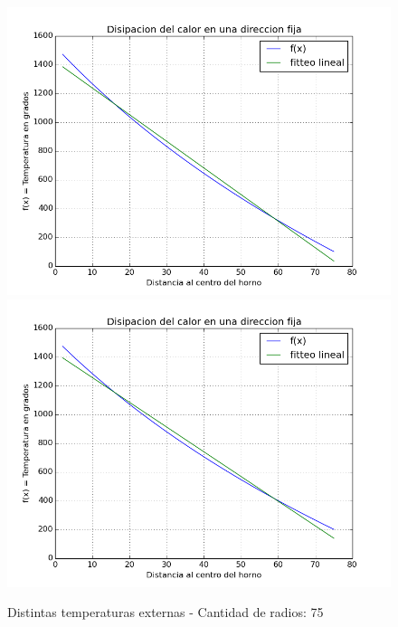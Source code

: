 \begin{figure}[h]
\centering
\includegraphics[scale=0.34]{funcion_temp_75_radios_ti_1500_te_102.png}
\includegraphics[scale=0.34]{funcion_temp_75_radios_ti_1500_te_202.png}
\caption{Distintas temperaturas externas - Cantidad de radios: 75}
\end{figure}
\FloatBarrier

